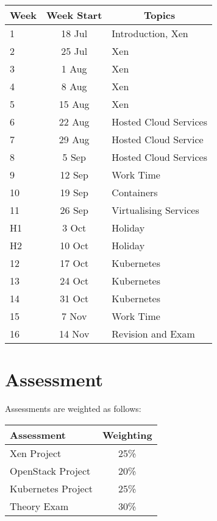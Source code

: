 \documentclass{article}
\begin{document}
\renewcommand{\arraystretch}{1.5}
\begin{tabular}{|l|c|l|}
\hline
 Week & Week Start & \multicolumn{1}{c|}{Topics}             \\ \hline
 1    & 18 Jul     & Introduction, Xen                            \\ \hline
 2    & 25 Jul     & Xen         \\ \hline
 3    &  1 Aug     & Xen                                     \\ \hline
 4    &  8 Aug     & Xen                                     \\ \hline
 5    & 15 Aug     & Xen                                     \\ \hline
 6    & 22 Aug     & Hosted Cloud Services                   \\ \hline
 7    & 29 Aug     & Hosted Cloud Service                    \\ \hline
 8    &  5 Sep     & Hosted Cloud Services                   \\ \hline
 9    & 12 Sep     & Work Time                               \\ \hline
 10   & 19 Sep     & Containers                              \\ \hline
 11   & 26 Sep     & Virtualising Services                                 \\ \hline
 H1   &  3 Oct     & Holiday                                 \\ \hline
 H2   & 10 Oct     & Holiday                             \\ \hline
 12   & 17 Oct     & Kubernetes                              \\ \hline
 13   & 24 Oct     & Kubernetes                              \\ \hline
 14   & 31 Oct     & Kubernetes                              \\ \hline
 15   &  7 Nov     & Work Time                               \\ \hline
 16   & 14 Nov     & Revision and Exam                       \\ \hline
\end{tabular}

\section*{Assessment}

Assessments are weighted as follows: \\
\begin{tabular}{|l|c|}
\hline
Assessment                  &  Weighting \\ \hline
Xen Project                 &  25\% \\ \hline
OpenStack Project      &  20\% \\ \hline
Kubernetes Project           &  25\% \\ \hline
Theory Exam                 &  30\% \\ \hline
\end{tabular}
\end{document}
